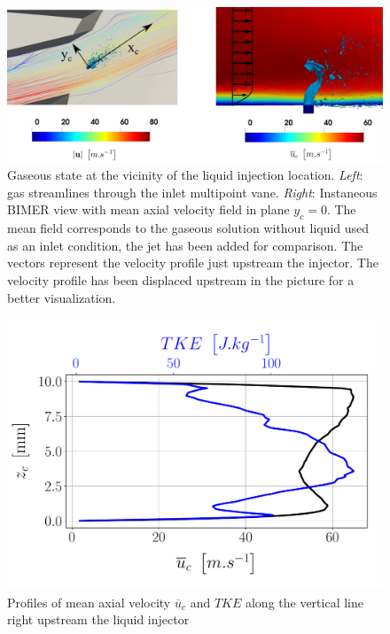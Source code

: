 \begin{figure}[ht]
\centering
\includegraphics[scale=0.225]{./part3_applications/figures_ch8_resolved/gaseous_profile_streamlines_and_vector}
\caption[Gaseous state at the vicinity of the liquid injection location]{Gaseous state at the vicinity of the liquid injection location. \textsl{Left}: gas streamlines through the inlet multipoint vane.  \textsl{Right}: Instaneous BIMER view with mean axial velocity field in plane $y_c = 0$. The mean field corresponds to the gaseous solution without liquid used as an inlet condition, the jet has been added for comparison. The vectors represent the velocity profile just upstream the injector. The velocity profile has been displaced upstream in the picture for a better visualization.}
\label{fig:BIMER_Umean_profile_with_jet}
\end{figure}



\begin{figure}[ht]
\centering
	\centering
   \includegraphics[scale=0.4]{./part3_applications/figures_ch8_resolved/gas_inlet_profiles}
   \vspace*{-0.15in}
   \caption{Profiles of mean axial velocity $\overline{u}_c$ and $TKE$ along the vertical line right upstream the liquid injector}
\label{fig:BIMER_gas_inlet_profiles}
\end{figure}




